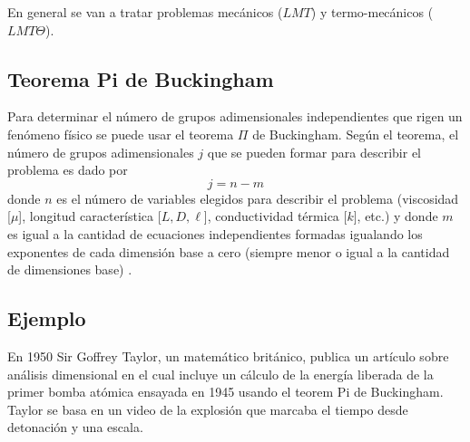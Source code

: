 En general se van a tratar problemas mecánicos ($LMT$) y termo-mecánicos ($LMT\Theta$).

\subsection{Teorema Pi de Buckingham}
 
 Para determinar el número de grupos adimensionales independientes que rigen un fenómeno físico se puede usar el teorema $\Pi$ de Buckingham. Según el teorema, el número de grupos adimensionales $j$ que se pueden formar para describir el problema es dado por
 \[
 j=n-m
 \]
 donde $n$ es el número de variables elegidos para describir el problema (viscosidad [$\mu$], longitud característica [$L,D,\ell$], conductividad térmica [$k$], etc.) y donde $m$ es igual a la cantidad de ecuaciones independientes formadas igualando los exponentes de cada dimensión base a cero (siempre menor o igual a la cantidad de dimensiones base) \citep{kreith2011principles}. 
 
 \subsection{Ejemplo}
  En 1950 Sir Goffrey Taylor, un matemático británico, publica un artículo sobre análisis dimensional en el cual incluye un cálculo de la energía liberada de la primer bomba atómica ensayada en 1945 usando el teorem Pi de Buckingham. Taylor se basa en un video de la explosión que marcaba el tiempo desde detonación y una escala. 
  
